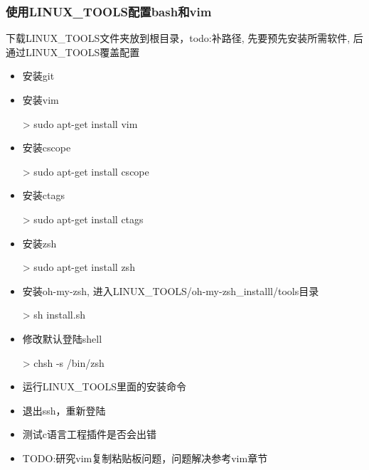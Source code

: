 \subsubsection{使用LINUX\_TOOLS配置bash和vim}
下载LINUX\_TOOLS文件夹放到根目录，todo:补路径, 先要预先安装所需软件, 后通过LINUX\_TOOLS覆盖配置
\begin{itemize}

\item 安装git

\item 安装vim
\begin{commandbox}
 > sudo apt-get install vim
\end{commandbox}

\item 安装cscope
\begin{commandbox}
 > sudo apt-get install cscope
\end{commandbox}

\item 安装ctags
\begin{commandbox}
 > sudo apt-get install ctags
\end{commandbox}

\item 安装zsh
\begin{commandbox}
 > sudo apt-get install zsh
\end{commandbox}

\item 安装oh-my-zsh, 进入LINUX\_TOOLS/oh-my-zsh\_installl/tools目录
\begin{commandbox}
 > sh install.sh
\end{commandbox}

\item 修改默认登陆shell
\begin{commandbox}
 > chsh -s /bin/zsh
\end{commandbox}

\item 运行LINUX\_TOOLS里面的安装命令

\item 退出ssh，重新登陆

\item 测试c语言工程插件是否会出错

\item TODO:研究vim复制粘贴板问题，问题解决参考vim章节
\end{itemize}


